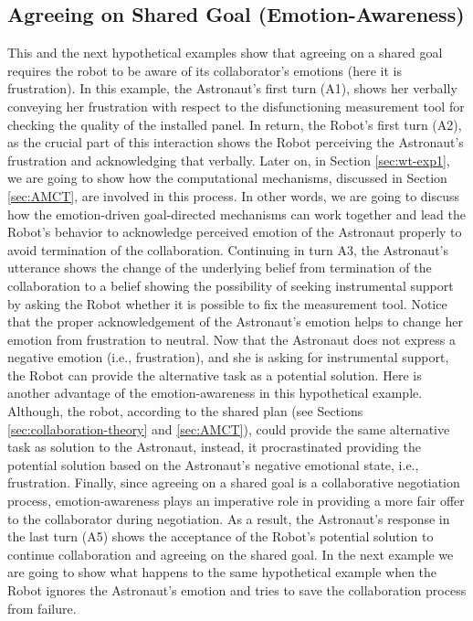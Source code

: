\subsection{Agreeing on Shared Goal (Emotion-Awareness)}
\label{sec:exp1}

This and the next hypothetical examples show that agreeing on a shared goal
requires the robot to be aware of its collaborator's emotions (here it is
frustration). In this example, the Astronaut's first turn (A1), shows her
verbally conveying her frustration with respect to the disfunctioning
measurement tool for checking the quality of the installed panel. In return, the
Robot's first turn (A2), as the crucial part of this interaction shows the Robot
perceiving the Astronaut's frustration and acknowledging that verbally. Later
on, in Section \ref{sec:wt-exp1}, we are going to show how the computational
mechanisms, discussed in Section \ref{sec:AMCT}, are involved in this process.
In other words, we are going to discuss how the emotion-driven goal-directed
mechanisms can work together and lead the Robot's behavior to acknowledge
perceived emotion of the Astronaut properly to avoid termination of the
collaboration. Continuing in turn A3, the Astronaut's utterance shows the change
of the underlying belief from termination of the collaboration to a belief
showing the possibility of seeking instrumental support by asking the Robot
whether it is possible to fix the measurement tool. Notice that the proper
acknowledgement of the Astronaut's emotion helps to change her emotion from
frustration to neutral. Now that the Astronaut does not express a negative
emotion (i.e., frustration), and she is asking for instrumental support, the
Robot can provide the alternative task as a potential solution. Here is another
advantage of the emotion-awareness in this hypothetical example. Although, the
robot, according to the shared plan (see Sections \ref{sec:collaboration-theory}
and \ref{sec:AMCT}), could provide the same alternative task as solution to the
Astronaut, instead, it procrastinated providing the potential solution based on
the Astronaut's negative emotional state, i.e., frustration. Finally, since
agreeing on a shared goal is a collaborative negotiation process,
emotion-awareness plays an imperative role in providing a more fair offer to the
collaborator during negotiation. As a result, the Astronaut's response in the
last turn (A5) shows the acceptance of the Robot's potential solution to
continue collaboration and agreeing on the shared goal. In the next example we
are going to show what happens to the same hypothetical example when the Robot
ignores the Astronaut's emotion and tries to save the collaboration process from
failure.\\

